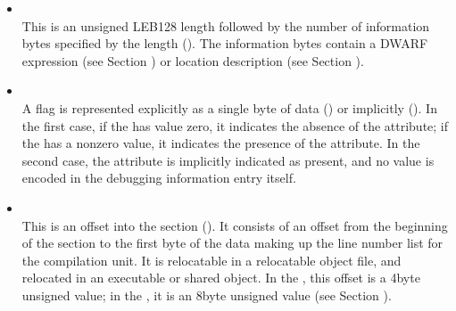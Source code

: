 \begin{itemize}
The data in , 
, 
 and
can be anything. Depending on context, it may
be a signed integer, an unsigned integer, a floating\dash point
constant, or anything else. A consumer must use context to
know how to interpret the bits, which if they are target
machine data (such as an integer or floating point constant)
will be in target machine byte\dash order.

\textit{If one of the \textless n\textgreater 
forms is used to represent a
signed or unsigned integer, it can be hard for a consumer
to discover the context necessary to determine which
interpretation is intended. Producers are therefore strongly
encouraged to use  or 
 for signed and
unsigned integers respectively, rather than 
\textless n\textgreater.}

\item {} \\
This is an unsigned LEB128 length followed by the
number of information bytes specified by the length
(). 
The information bytes contain a DWARF expression 
(see Section ) 
or location description 
(see Section ).

\item {} \\
A flag 
is represented explicitly as a single byte of data
() or 
implicitly (). 
In the
first case, if the  has value zero, it indicates the
absence of the attribute; if the  has a non\dash zero value,
it indicates the presence of the attribute. In the second
case, the attribute is implicitly indicated as present, and
no value is encoded in the debugging information entry itself.

\item {} \\
This is an offset into 
the 
\dotdebugline{} section
().
It consists of an offset from the beginning of the 
\dotdebugline{}
section to the first byte of
the data making up the line number list for the compilation
unit. 
It is relocatable in a relocatable object file, and
relocated in an executable or shared object. In the 
\thirtytwobitdwarfformat, this offset is a 4\dash byte unsigned value;
in the \sixtyfourbitdwarfformat, it is an 8\dash byte unsigned value
(see Section ).



\end{itemize}
